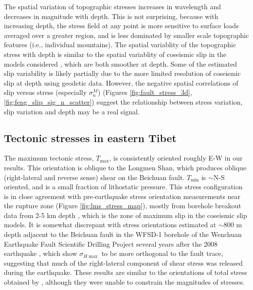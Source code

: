 \documentclass[draft,jgrga]{AGUTeX}
\begin{document}
\begin{article}
The spatial variation of topographic stresses increases in wavelength and
decreases in magnitude with depth. This is not surprising, because with
increasing
depth, the stress field at any point is more sensitive to surface loads
averaged over a greater region, and is less dominated by smaller scale
topographic features (i.e., individual mountains). The spatial
variablity of the topographic stress with depth is similar to the spatial
variablity of coseismic slip in the models considered \citep[e.g.,][]
{zhang2011}, which are both smoother at depth. Some of the
estimated slip variability is likely partially due to the more limited
resolution of coseismic slip at depth using geodetic data.
However, the negative spatial correlations of slip versus stress
(especially $\sigma^M_n$) (Figures \ref{fig:fault_stress_3d},
\ref{fig:feng_slip_sig_n_scatter}) suggest the relationship between
stress variation, slip variation and depth may be a real signal.

\subsection{Tectonic stresses in eastern
Tibet}\label{tectonic-stresses-in-eastern-tibet}

The maximum tectonic stress, $T_{\mathrm{max}}$, is consistently
oriented roughly E-W in our results. This orientation is oblique to the
Longmen Shan, which produces oblique (right-lateral and reverse sense)
shear on the Beichuan fault. $T_{\mathrm{min}}$ is $\sim$N-S
oriented, and is a small fraction of lithostatic pressure. This
stress configuration is in close agreement with pre-earthquake stress
orientation
measurements near the rupture zone (Figure \ref{fig:lms_stress_map}),
mostly from borehole breakout data from 2-5 km depth
\citep{heidbach2009}, which is the zone of maximum slip in the coseismic
slip models. It is somewhat discrepant with stress orientations
estimated at $\sim$800 m depth adjacent to the Beichuan fault
in the WFSD-1 borehole of the Wenchuan Earthquake Fault Scientific
Drilling Project several years after the 2008 earthquake \citep{cui2014},
which show $\sigma_{H{\mathrm{\max}}}$ to be more orthogonal to the fault
trace, suggesting that much of the right-lateral component of shear
stress was released during the earthquake. These results are similar to
the orientations of total stress obtained by 
\citet{medinaluna2013}, although they were unable to constrain the
magnitudes of stresses.


\end{article}
\end{document}
